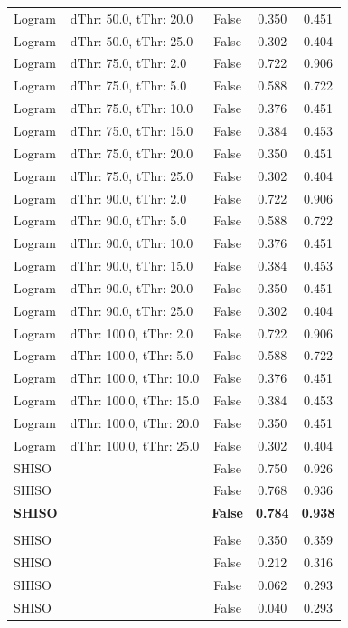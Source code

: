 \begin{small}
\begin{longtable}{llccc}
Logram & dThr: 50.0, tThr: 20.0 & False & 0.350 & 0.451 \\
Logram & dThr: 50.0, tThr: 25.0 & False & 0.302 & 0.404 \\
Logram & dThr: 75.0, tThr: 2.0 & False & 0.722 & 0.906 \\
Logram & dThr: 75.0, tThr: 5.0 & False & 0.588 & 0.722 \\
Logram & dThr: 75.0, tThr: 10.0 & False & 0.376 & 0.451 \\
Logram & dThr: 75.0, tThr: 15.0 & False & 0.384 & 0.453 \\
Logram & dThr: 75.0, tThr: 20.0 & False & 0.350 & 0.451 \\
Logram & dThr: 75.0, tThr: 25.0 & False & 0.302 & 0.404 \\
Logram & dThr: 90.0, tThr: 2.0 & False & 0.722 & 0.906 \\
Logram & dThr: 90.0, tThr: 5.0 & False & 0.588 & 0.722 \\
Logram & dThr: 90.0, tThr: 10.0 & False & 0.376 & 0.451 \\
Logram & dThr: 90.0, tThr: 15.0 & False & 0.384 & 0.453 \\
Logram & dThr: 90.0, tThr: 20.0 & False & 0.350 & 0.451 \\
Logram & dThr: 90.0, tThr: 25.0 & False & 0.302 & 0.404 \\
Logram & dThr: 100.0, tThr: 2.0 & False & 0.722 & 0.906 \\
Logram & dThr: 100.0, tThr: 5.0 & False & 0.588 & 0.722 \\
Logram & dThr: 100.0, tThr: 10.0 & False & 0.376 & 0.451 \\
Logram & dThr: 100.0, tThr: 15.0 & False & 0.384 & 0.453 \\
Logram & dThr: 100.0, tThr: 20.0 & False & 0.350 & 0.451 \\
Logram & dThr: 100.0, tThr: 25.0 & False & 0.302 & 0.404 \\
\midrule
SHISO &  & False & 0.750 & 0.926 \\
SHISO &  & False & 0.768 & 0.936 \\
\textbf{SHISO} & \textbf{} & \textbf{False} & \textbf{0.784} & \textbf{0.938} \\\\
SHISO &  & False & 0.350 & 0.359 \\
SHISO &  & False & 0.212 & 0.316 \\
SHISO &  & False & 0.062 & 0.293 \\
SHISO &  & False & 0.040 & 0.293 \\

\end{longtable}
\end{small}
